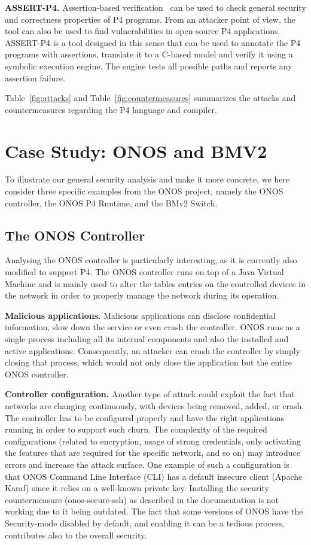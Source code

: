 \documentclass[10pt,sigconf]{acmart}
\begin{document}
\textbf{ASSERT-P4.} Assertion-based verification~\cite{assertp4} can be used 
to check general security and  correctness
properties of P4 programs. 
From an attacker point of view, the tool can also 
be used to find vulnerabilities in open-source
P4 applications.
ASSERT-P4 is a tool designed in this sense that can be used to annotate the P4 programs with assertions, translate it to a C-based model and verify it using a symbolic execution engine. The engine tests all possible paths and reports any assertion failure.


Table~\ref{fig:attacks} and Table~\ref{fig:countermeasures} summarizes the attacks 
and countermeasures regarding the P4 language and compiler.


\section{Case Study: ONOS and BMV2}

To illustrate our general security analysis 
 and make it more concrete, we here consider three specific
examples from the ONOS project, namely the ONOS controller, the ONOS
P4 Runtime, and the BMv2 Switch.


\subsection{The ONOS Controller}

Analysing the ONOS controller is particularly interesting, as it is
currently also modified to support P4. The ONOS controller runs on top
of a Java Virtual Machine and is mainly used to alter the tables
entries on the controlled devices in the network in order to properly
manage the network during its operation.

\textbf{Malicious applications.} Malicious applications can disclose confidential information, slow
down the service or even crash the controller. ONOS runs as a single
process including all its internal components and also the installed
and active applications. Consequently, an attacker can crash the
controller by simply closing that process, which would not only close
the application but the entire ONOS controller.

\textbf{Controller configuration.} Another type of attack could exploit the fact that networks 
are changing continuously, with devices being removed,
added, or crash. 
The controller has to
be configured properly and have the right applications 
running in order to support such churn.
The complexity of the required configurations
(related to encryption, usage of strong credentials, 
only activating the
features that are required for the specific network, and so on)
may introduce errors and increase the attack surface. 
One example of such a configuration is that ONOS Command Line Interface (CLI) has a default insecure client (Apache Karaf) since it relies on a well-known private key. Installing the security countermeasure (onos-secure-ssh) as described in the documentation is not working due to it being outdated. The fact that some versions of ONOS have the Security-mode disabled by default, and enabling it can be a tedious process, contributes also to the overall security.
\end{document}
